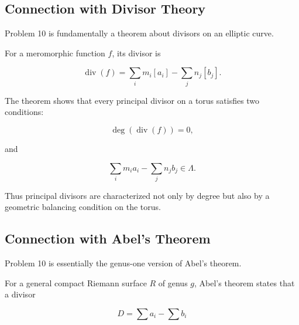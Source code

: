\documentclass[12pt,a4paper]{article}
\theoremstyle{notespace}
\begin{document}
\subsection{Connection with Divisor Theory}

Problem 10 is fundamentally a theorem about divisors on an elliptic curve.

For a meromorphic function \(f\), its divisor is

\[
\operatorname{div}(f)
=
\sum_i m_i[a_i]
-
\sum_j n_j[b_j].
\]

The theorem shows that every principal divisor on a torus satisfies two conditions:

\[
\deg(\operatorname{div}(f))=0,
\]

and

\[
\sum_i m_i a_i
-
\sum_j n_j b_j
\in \Lambda.
\]

Thus principal divisors are characterized not only by degree but also by a geometric balancing condition on the torus.

\begin{center}
\end{center}

\subsection{Connection with Abel's Theorem}

Problem 10 is essentially the genus-one version of Abel's theorem.

For a general compact Riemann surface \(R\) of genus \(g\), Abel's theorem states that a divisor

\[
D=\sum a_i-\sum b_i
\]
\end{document}
